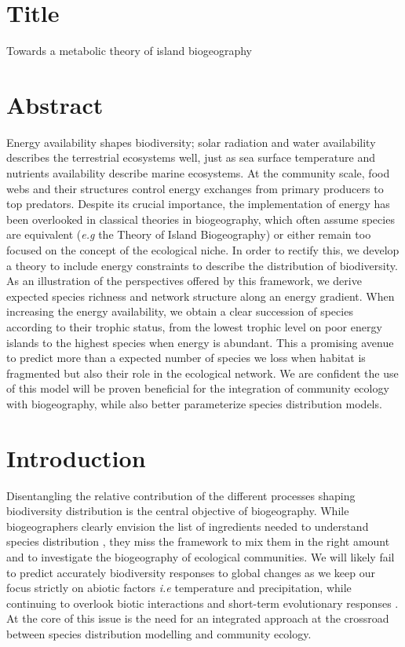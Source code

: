 \section{Title}\label{title}

Towards a metabolic theory of island biogeography

\section{Abstract}\label{abstract}

Energy availability shapes biodiversity; solar radiation and water
availability describes the terrestrial ecosystems well, just as sea
surface temperature and nutrients availability describe marine
ecosystems. At the community scale, food webs and their structures
control energy exchanges from primary producers to top predators.
Despite its crucial importance, the implementation of energy has been
overlooked in classical theories in biogeography, which often assume
species are equivalent (\emph{e.g} the Theory of Island Biogeography) or
either remain too focused on the concept of the ecological niche. In
order to rectify this, we develop a theory to include energy constraints
to describe the distribution of biodiversity. As an illustration of the
perspectives offered by this framework, we derive expected species
richness and network structure along an energy gradient. When increasing
the energy availability, we obtain a clear succession of species
according to their trophic status, from the lowest trophic level on poor
energy islands to the highest species when energy is abundant. This a
promising avenue to predict more than a expected number of species we
loss when habitat is fragmented but also their role in the ecological
network. We are confident the use of this model will be proven
beneficial for the integration of community ecology with biogeography,
while also better parameterize species distribution models.

\section{Introduction}\label{introduction}

Disentangling the relative contribution of the different processes
shaping biodiversity distribution is the central objective of
biogeography. While biogeographers clearly envision the list of
ingredients needed to understand species distribution
\citep{Thuiller2013}, they miss the framework to mix them in the right
amount and to investigate the biogeography of ecological communities. We
will likely fail to predict accurately biodiversity responses to global
changes as we keep our focus strictly on abiotic factors \emph{i.e}
temperature and precipitation, while continuing to overlook biotic
interactions \citep{Wiens2011} and short-term evolutionary responses
\citep{Lavergne2010}. At the core of this issue is the need for an
integrated approach at the crossroad between species distribution
modelling and community ecology.

